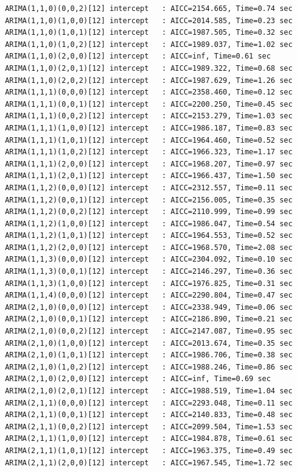 \documentclass[a4paper, 12pt]{article}
\begin{document}
\begin{verbatim}
 ARIMA(1,1,0)(0,0,2)[12] intercept   : AICC=2154.665, Time=0.74 sec
 ARIMA(1,1,0)(1,0,0)[12] intercept   : AICC=2014.585, Time=0.23 sec
 ARIMA(1,1,0)(1,0,1)[12] intercept   : AICC=1987.505, Time=0.32 sec
 ARIMA(1,1,0)(1,0,2)[12] intercept   : AICC=1989.037, Time=1.02 sec
 ARIMA(1,1,0)(2,0,0)[12] intercept   : AICC=inf, Time=0.61 sec
 ARIMA(1,1,0)(2,0,1)[12] intercept   : AICC=1989.322, Time=0.68 sec
 ARIMA(1,1,0)(2,0,2)[12] intercept   : AICC=1987.629, Time=1.26 sec
 ARIMA(1,1,1)(0,0,0)[12] intercept   : AICC=2358.460, Time=0.12 sec
 ARIMA(1,1,1)(0,0,1)[12] intercept   : AICC=2200.250, Time=0.45 sec
 ARIMA(1,1,1)(0,0,2)[12] intercept   : AICC=2153.279, Time=1.03 sec
 ARIMA(1,1,1)(1,0,0)[12] intercept   : AICC=1986.187, Time=0.83 sec
 ARIMA(1,1,1)(1,0,1)[12] intercept   : AICC=1964.460, Time=0.52 sec
 ARIMA(1,1,1)(1,0,2)[12] intercept   : AICC=1966.323, Time=1.17 sec
 ARIMA(1,1,1)(2,0,0)[12] intercept   : AICC=1968.207, Time=0.97 sec
 ARIMA(1,1,1)(2,0,1)[12] intercept   : AICC=1966.437, Time=1.50 sec
 ARIMA(1,1,2)(0,0,0)[12] intercept   : AICC=2312.557, Time=0.11 sec
 ARIMA(1,1,2)(0,0,1)[12] intercept   : AICC=2156.005, Time=0.35 sec
 ARIMA(1,1,2)(0,0,2)[12] intercept   : AICC=2110.999, Time=0.99 sec
 ARIMA(1,1,2)(1,0,0)[12] intercept   : AICC=1986.047, Time=0.54 sec
 ARIMA(1,1,2)(1,0,1)[12] intercept   : AICC=1964.553, Time=0.52 sec
 ARIMA(1,1,2)(2,0,0)[12] intercept   : AICC=1968.570, Time=2.08 sec
 ARIMA(1,1,3)(0,0,0)[12] intercept   : AICC=2304.092, Time=0.10 sec
 ARIMA(1,1,3)(0,0,1)[12] intercept   : AICC=2146.297, Time=0.36 sec
 ARIMA(1,1,3)(1,0,0)[12] intercept   : AICC=1976.825, Time=0.31 sec
 ARIMA(1,1,4)(0,0,0)[12] intercept   : AICC=2290.804, Time=0.47 sec
 ARIMA(2,1,0)(0,0,0)[12] intercept   : AICC=2338.949, Time=0.06 sec
 ARIMA(2,1,0)(0,0,1)[12] intercept   : AICC=2186.890, Time=0.21 sec
 ARIMA(2,1,0)(0,0,2)[12] intercept   : AICC=2147.087, Time=0.95 sec
 ARIMA(2,1,0)(1,0,0)[12] intercept   : AICC=2013.674, Time=0.35 sec
 ARIMA(2,1,0)(1,0,1)[12] intercept   : AICC=1986.706, Time=0.38 sec
 ARIMA(2,1,0)(1,0,2)[12] intercept   : AICC=1988.246, Time=0.86 sec
 ARIMA(2,1,0)(2,0,0)[12] intercept   : AICC=inf, Time=0.69 sec
 ARIMA(2,1,0)(2,0,1)[12] intercept   : AICC=1988.519, Time=1.04 sec
 ARIMA(2,1,1)(0,0,0)[12] intercept   : AICC=2293.048, Time=0.11 sec
 ARIMA(2,1,1)(0,0,1)[12] intercept   : AICC=2140.833, Time=0.48 sec
 ARIMA(2,1,1)(0,0,2)[12] intercept   : AICC=2099.504, Time=1.53 sec
 ARIMA(2,1,1)(1,0,0)[12] intercept   : AICC=1984.878, Time=0.61 sec
 ARIMA(2,1,1)(1,0,1)[12] intercept   : AICC=1963.375, Time=0.49 sec
 ARIMA(2,1,1)(2,0,0)[12] intercept   : AICC=1967.545, Time=1.72 sec

\end{verbatim}
\end{document}
